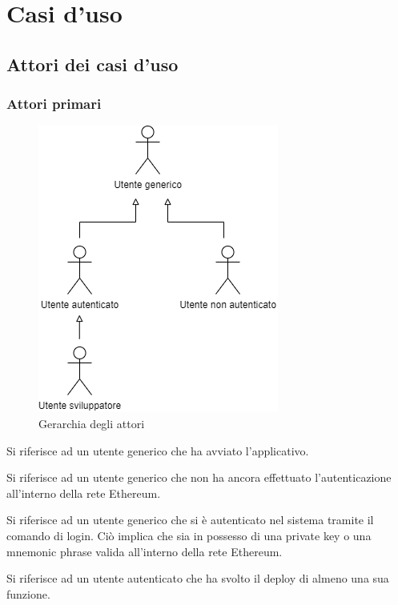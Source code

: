 \section{Casi d'uso}
\subsection{Attori dei casi d'uso}

	\subsubsection{Attori primari}
		\begin{figure}[h]
			\centering
			\includegraphics[scale=0.5]{./res/img/gerarchia.png}
			\caption {Gerarchia degli attori}
		\end{figure}
		\begin{description}[style=nextline]
			\item[\textbf{Utente generico}]
				Si riferisce ad un utente generico che ha avviato l'applicativo. 
			\item[\textbf{Utente non autenticato}]
				Si riferisce ad un utente generico che non ha ancora effettuato l'autenticazione all'interno della rete Ethereum. 
			\item[\textbf{Utente autenticato}]
				Si riferisce ad un utente generico che si è autenticato nel sistema tramite il comando di login. Ciò implica che sia in possesso di una private key o una mnemonic phrase valida all'interno della rete Ethereum. 
			\item[\textbf{Utente sviuppatore}] 
				Si riferisce ad un utente autenticato che ha svolto il deploy di almeno una sua funzione. 
		\end{description}
	
